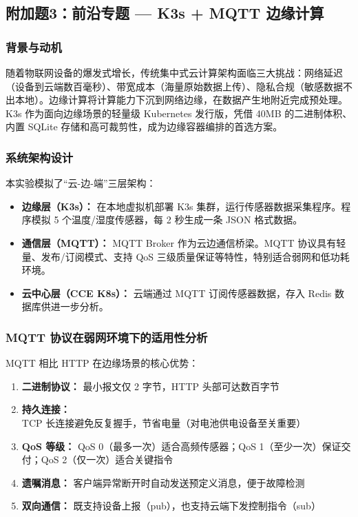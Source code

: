 \documentclass[12pt,a4paper]{ctexart}
\begin{document}
\subsection{附加题3：前沿专题 — K3s + MQTT 边缘计算}

\subsubsection{背景与动机}

随着物联网设备的爆发式增长，传统集中式云计算架构面临三大挑战：网络延迟（设备到云端数百毫秒）、带宽成本（海量原始数据上传）、隐私合规（敏感数据不出本地）。边缘计算将计算能力下沉到网络边缘，在数据产生地附近完成预处理。K3s 作为面向边缘场景的轻量级 Kubernetes 发行版，凭借 40MB 的二进制体积、内置 SQLite 存储和高可裁剪性，成为边缘容器编排的首选方案。

\subsubsection{系统架构设计}

本实验模拟了“云-边-端”三层架构：
\begin{itemize}
  \item \textbf{边缘层（K3s）：} 在本地虚拟机部署 K3s 集群，运行传感器数据采集程序。程序模拟 5 个温度/湿度传感器，每 2 秒生成一条 JSON 格式数据。
  \item \textbf{通信层（MQTT）：} MQTT Broker 作为云边通信桥梁。MQTT 协议具有轻量、发布/订阅模式、支持 QoS 三级质量保证等特性，特别适合弱网和低功耗环境。
  \item \textbf{云中心层（CCE K8s）：} 云端通过 MQTT 订阅传感器数据，存入 Redis 数据库供进一步分析。
\end{itemize}

\subsubsection{MQTT 协议在弱网环境下的适用性分析}

MQTT 相比 HTTP 在边缘场景的核心优势：
\begin{enumerate}
  \item \textbf{二进制协议：} 最小报文仅 2 字节，HTTP 头部可达数百字节
  \item \textbf{持久连接：} TCP 长连接避免反复握手，节省电量（对电池供电设备至关重要）
  \item \textbf{QoS 等级：} QoS 0（最多一次）适合高频传感器；QoS 1（至少一次）保证交付；QoS 2（仅一次）适合关键指令
  \item \textbf{遗嘱消息：} 客户端异常断开时自动发送预定义消息，便于故障检测
  \item \textbf{双向通信：} 既支持设备上报（pub），也支持云端下发控制指令（sub）
\end{enumerate}
\end{document}

